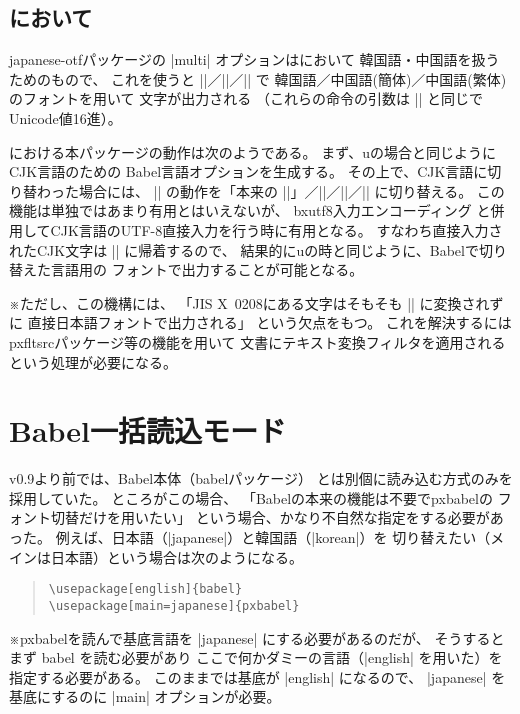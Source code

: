\documentclass[a4paper,uplatex]{jsarticle}
\newcommand{\Pkg}[1]{\textsf{#1}}
\newcommand{\Note}{\par\noindent ※}
\providecommand{\upLaTeX}{u\pLaTeX}
\begin{document}
\subsection{{\pLaTeX}において}

\Pkg{japanese-otf}パッケージの |multi| オプションは{\pLaTeX}において
韓国語・中国語を扱うためのもので、
これを使うと |\UTFK|／|\UTFC|／|\UTFT| で
韓国語／中国語(簡体)／中国語(繁体)のフォントを用いて
文字が出力される
（これらの命令の引数は |\UTF| と同じでUnicode値16進）。

{\pLaTeX}における本パッケージの動作は次のようである。
まず、{\upLaTeX}の場合と同じようにCJK言語のための
Babel言語オプションを生成する。
その上で、CJK言語に切り替わった場合には、
|\UTF| の動作を「本来の |\UTF|」／|\UTFK|／|\UTFC|／|\UTFT|
に切り替える。
この機能は単独ではあまり有用とはいえないが、
\Pkg{bxutf8}入力エンコーディング
と併用してCJK言語のUTF-8直接入力を行う時に有用となる。
すなわち直接入力されたCJK文字は |\UTF| に帰着するので、
結果的に{\upLaTeX}の時と同じように、Babelで切り替えた言語用の
フォントで出力することが可能となる。

\Note ただし、この機構には、
「JIS X~0208にある文字はそもそも |\UTF| に変換されずに
直接日本語フォントで出力される」
という欠点をもつ。
これを解決するには\Pkg{pxfltsrc}パッケージ等の機能を用いて
文書にテキスト変換フィルタを適用されるという処理が必要になる。

\section{Babel一括読込モード}

v0.9より前では、Babel本体（\Pkg{babel}パッケージ）
とは別個に読み込む方式のみを採用していた。
ところがこの場合、
「Babelの本来の機能は不要で\Pkg{pxbabel}の
フォント切替だけを用いたい」
という場合、かなり不自然な指定をする必要があった。
例えば、日本語（|japanese|）と韓国語（|korean|）を
切り替えたい（メインは日本語）という場合は次のようになる。

\begin{quote}\begin{verbatim}
\usepackage[english]{babel}
\usepackage[main=japanese]{pxbabel}
\end{verbatim}\end{quote}
\Note \Pkg{pxbabel}を読んで基底言語を |japanese|
にする必要があるのだが、
そうするとまず \Pkg{babel} を読む必要があり
ここで何かダミーの言語（|english| を用いた）を指定する必要がある。
このままでは基底が |english| になるので、
|japanese| を基底にするのに |main| オプションが必要。
\end{document}
